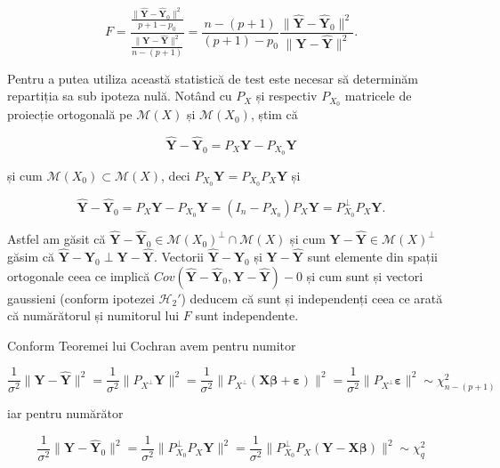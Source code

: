 \documentclass[]{article}
\begin{document}
\[
  F = \frac{\frac{\lVert\hat{\boldsymbol Y} - \hat{\boldsymbol Y}_0\rVert^2}{p+1-p_0}}{\frac{\lVert\boldsymbol Y - \hat{\boldsymbol Y}\rVert^2}{n - (p+1)}} = \frac{n - (p+1)}{(p+1) - p_0}\frac{\lVert\hat{\boldsymbol Y} - \hat{\boldsymbol Y}_0\rVert^2}{\lVert\boldsymbol Y - \hat{\boldsymbol Y}\rVert^2}.
\]

Pentru a putea utiliza această statistică de test este necesar să
determinăm repartiția sa sub ipoteza nulă. Notând cu \(P_X\) și
respectiv \(P_{X_0}\) matricele de proiecție ortogonală pe
\(\mathcal{M}(X)\) și \(\mathcal{M}(X_0)\), știm că

\[
  \hat{\boldsymbol Y} - \hat{\boldsymbol Y}_0 = P_X\boldsymbol Y - P_{X_0}\boldsymbol Y
\]

și cum \(\mathcal{M}(X_0)\subset \mathcal{M}(X)\), deci
\(P_{X_0}\boldsymbol Y = P_{X_0}P_{X}\boldsymbol Y\) și

\[
  \hat{\boldsymbol Y} - \hat{\boldsymbol Y}_0 = P_{X}\boldsymbol Y -  P_{X_0}\boldsymbol Y =  (I_n - P_{X_0})P_X\boldsymbol Y = P_{X_0}^\perp P_{X}\boldsymbol Y.
\]

Astfel am găsit că
\(\hat{\boldsymbol Y} - \hat{\boldsymbol Y}_0\in\mathcal{M}(X_0)^\perp\cap \mathcal{M}(X)\)
și cum \(\boldsymbol Y - \hat{\boldsymbol Y}\in\mathcal{M}(X)^\perp\)
găsim că
\(\hat{\boldsymbol Y} - \hat{\boldsymbol Y}_0 \perp \boldsymbol Y - \hat{\boldsymbol Y}\).
Vectorii \(\hat{\boldsymbol Y} - \hat{\boldsymbol Y}_0\) și
\(\boldsymbol Y - \hat{\boldsymbol Y}\) sunt elemente din spații
ortogonale ceea ce implică
\(Cov(\hat{\boldsymbol Y} - \hat{\boldsymbol Y}_0, \boldsymbol Y - \hat{\boldsymbol Y}) - 0\)
și cum sunt și vectori gaussieni (conform ipotezei \(\mathcal{H}_2'\))
deducem că sunt și independenți ceea ce arată că numărătorul și
numitorul lui \(F\) sunt independente.

Conform Teoremei lui Cochran avem pentru numitor

\[ 
  \frac{1}{\sigma^2}\lVert\boldsymbol Y - \hat{\boldsymbol Y}\rVert^2 = \frac{1}{\sigma^2}\lVert P_{X^\perp}\boldsymbol Y\rVert^2 = \frac{1}{\sigma^2}\lVert P_{X^\perp}(\boldsymbol X\boldsymbol\beta + \boldsymbol\varepsilon)\rVert^2 = \frac{1}{\sigma^2}\lVert P_{X^\perp}\boldsymbol\varepsilon\rVert^2\sim\chi^2_{n - (p+1)}
\]

iar pentru numărător

\[
\frac{1}{\sigma^2}\lVert\hat{\boldsymbol Y} - \hat{\boldsymbol Y}_0\rVert^2 = \frac{1}{\sigma^2}\lVert P_{X_0}^\perp P_{X}\boldsymbol Y\rVert^2 = \frac{1}{\sigma^2}\lVert P_{X_0}^\perp P_{X}(\boldsymbol Y - \boldsymbol X\boldsymbol\beta)\rVert^2 \sim \chi^2_{q}
\]
\end{document}
